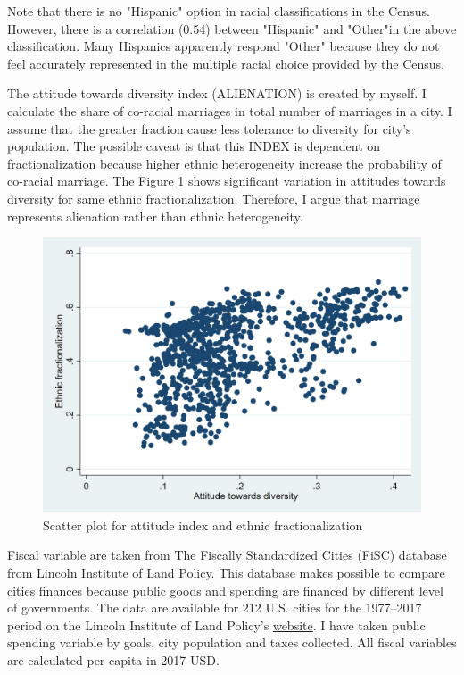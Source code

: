\documentclass[letterpaper,11pt]{article}
\begin{document}
Note that there is no "Hispanic" option in racial classifications in the Census. However, there is a correlation (0.54) between "Hispanic" and "Other"in the above classification. Many Hispanics apparently respond "Other" because they do not feel accurately represented in the multiple racial choice provided by the Census.

The attitude towards diversity index (ALIENATION) is created by myself. I calculate the share of co-racial marriages in total number of marriages in a city. I assume that the greater fraction cause less tolerance to diversity for city's population. The possible caveat is that this INDEX is dependent on fractionalization because higher ethnic heterogeneity increase the probability of co-racial marriage.
The Figure \ref{fig:frac-index} shows significant variation in attitudes towards diversity for same ethnic fractionalization. Therefore, I argue that marriage represents alienation rather than ethnic heterogeneity.

\begin{figure}
    \centering
    \includegraphics[scale = 0.4]{Thesis/Econometrics US/frac - index.png}
    \caption{Scatter plot for attitude index and ethnic fractionalization}
    \label{fig:frac-index}
\end{figure}

Fiscal variable are taken from The Fiscally Standardized Cities (FiSC) database from Lincoln Institute of Land Policy. This database makes possible to compare cities finances because public goods and spending are financed by different level of governments. The data are available for 212 U.S. cities for the 1977–2017 period on the Lincoln Institute of Land Policy’s \hyperlink{https://www.lincolninst.edu/research-data/data-toolkits/fiscally-standardized-cities}{website}. I have taken public spending variable by goals, city population and taxes collected. All fiscal variables are calculated per capita in 2017 USD.
\end{document}
